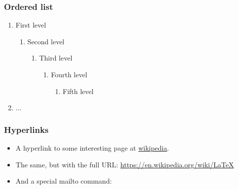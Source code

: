 \documentclass[t, xcolor=table, aspectratio=169]{beamer}
\begin{document}
    \begin{frame}
        \frametitle{Ordered list}
        \begin{enumerate}
            \item First level
            \begin{enumerate}
                \item Second level
                \begin{enumerate}
                    \item Third level
                    \begin{enumerate}
                        \item Fourth level
                        \begin{enumerate}
                            \item Fifth level
                        \end{enumerate}
                    \end{enumerate}
                \end{enumerate}
            \end{enumerate}
            \item ...
        \end{enumerate}
    \end{frame}

    \begin{frame}
        \frametitle{Hyperlinks}
        \begin{itemize}
            \item A hyperlink to some interesting page at
                  \href{https://en.wikipedia.org/wiki/LaTeX}{wikipedia}.
            \vspace{2em} %
            \item The same, but with the full URL:
                  \url{https://en.wikipedia.org/wiki/LaTeX}
            \vspace{2em} %
            \item And a special mailto command:
        \end{itemize}
    \end{frame}
\end{document}
